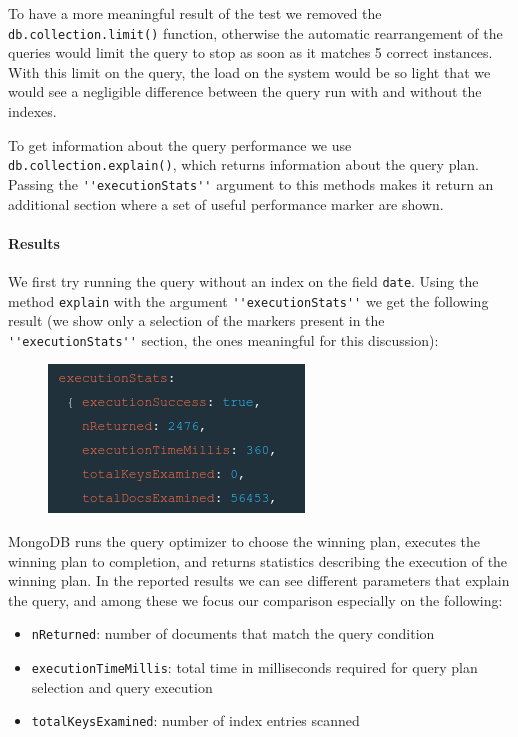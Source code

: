 \begin{enumerate}
    To have a more meaningful result of the test we removed the \verb|db.collection.limit()| function, otherwise the automatic rearrangement of the queries would limit the query to stop as soon as it matches 5 correct instances.
    With this limit on the query, the load on the system would be so light that we would see a negligible difference between the query run with and without the indexes.

    To get information about the query performance we use \verb|db.collection.explain()|, which returns information about the query plan.
    Passing the \verb|''executionStats''| argument to this methods makes it return an additional section where a set of useful performance marker are shown.

    \paragraph{Results} We first try running the query without an index on the field \verb|date|.
    Using the method \verb|explain| with the argument \verb|''executionStats''| we get the following result (we show only a selection of the markers present in the \verb|''executionStats''| section, the ones meaningful for this discussion):
    \begin{figure}[H]
        \begin{center}
            \includegraphics[width=0.3\linewidth]{ImagesMongoDB/ex_stat_wo_idx}
            \label{fig:ex_stat_wo_idx}%
        \end{center}
    \end{figure}
    MongoDB runs the query optimizer to choose the winning plan, executes the winning plan to completion, and returns statistics describing the execution of the winning plan.
    In the reported results we can see different parameters that explain the query, and among these we focus our comparison especially on the following:
    \begin{itemize}
        \item \verb!nReturned!: number of documents that match the query condition
        \item \verb!executionTimeMillis!: total time in milliseconds required for query plan selection and query execution
        \item \verb!totalKeysExamined!: number of index entries scanned

\end{itemize}
\end{enumerate}
